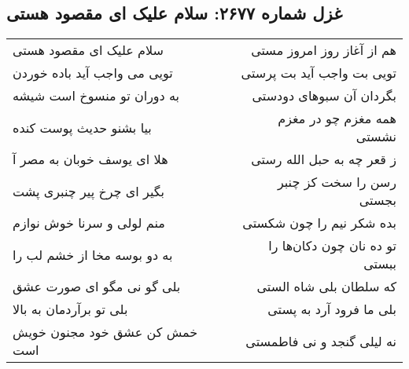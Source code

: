 \begin{center}
\section*{غزل شماره ۲۶۷۷: سلام علیک ای مقصود هستی}
\label{sec:2677}
\begin{longtable}{l p{0.5cm} r}
سلام علیک ای مقصود هستی
&&
هم از آغاز روز امروز مستی
\\
تویی می واجب آید باده خوردن
&&
تویی بت واجب آید بت پرستی
\\
به دوران تو منسوخ است شیشه
&&
بگردان آن سبوهای دودستی
\\
بیا بشنو حدیث پوست کنده
&&
همه مغزم چو در مغزم نشستی
\\
هلا ای یوسف خوبان به مصر آ
&&
ز قعر چه به حبل الله رستی
\\
بگیر ای چرخ پیر چنبری پشت
&&
رسن را سخت کز چنبر بجستی
\\
منم لولی و سرنا خوش نوازم
&&
بده شکر نیم را چون شکستی
\\
به دو بوسه مخا از خشم لب را
&&
تو ده نان چون دکان‌ها را ببستی
\\
بلی گو نی مگو ای صورت عشق
&&
که سلطان بلی شاه الستی
\\
بلی تو برآردمان به بالا
&&
بلی ما فرود آرد به پستی
\\
خمش کن عشق خود مجنون خویش است
&&
نه لیلی گنجد و نی فاطمستی
\\
\end{longtable}
\end{center}
